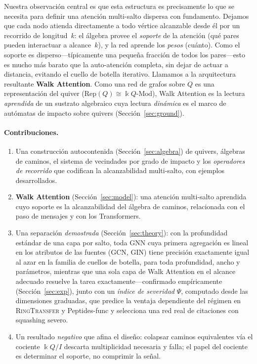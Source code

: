 \documentclass[runningheads]{llncs}
\newcommand{\kk}{\Bbbk}
\newcommand{\kQ}{\kk Q}
\begin{document}
Nuestra observación central es que esta estructura es precisamente lo que se
necesita para definir una atención multi-salto dispersa con fundamento. Dejamos
que cada nodo atienda directamente a todo vértice alcanzable desde él por un
recorrido de longitud~$k$: el álgebra provee el \emph{soporte} de la atención
(qué pares pueden interactuar a alcance~$k$), y la red aprende los \emph{pesos}
(cuánto). Como el soporte es disperso---típicamente una pequeña fracción de
todos los pares---esto es mucho más barato que la auto-atención completa, sin
dejar de actuar a distancia, evitando el cuello de botella iterativo. Llamamos
a la arquitectura resultante \textbf{Walk Attention}. Como una red de grafos sobre
$Q$ es una representación del quiver
($\mathrm{Rep}(Q)\cong\kQ\text{-}\mathrm{Mod}$), Walk Attention es la lectura
\emph{aprendida} de un sustrato algebraico cuya lectura \emph{dinámica} es el
marco de autómatas de impacto sobre quivers \cite{zainea2026aiq}
(Sección~\ref{sec:ground}).

\paragraph{Contribuciones.}
\begin{enumerate}
  \item Una construcción autocontenida (Sección~\ref{sec:algebra}) de quivers,
  álgebras de caminos, el sistema de vecindades por grado de impacto y los
  \emph{operadores de recorrido} que codifican la alcanzabilidad multi-salto,
  con ejemplos desarrollados.
  \item \textbf{Walk Attention} (Sección~\ref{sec:model}): una atención
  multi-salto aprendida cuyo soporte es la alcanzabilidad del álgebra de
  caminos, relacionada con el paso de mensajes y con los Transformers.
  \item Una separación \emph{demostrada} (Sección~\ref{sec:theory}): con la
  profundidad estándar de una capa por salto, toda GNN cuya primera agregación
  es lineal en los atributos de las fuentes (GCN, GIN) tiene precisión
  exactamente igual al azar en la familia de cuellos de botella, para toda
  profundidad, ancho y parámetros, mientras que una sola capa de Walk Attention
  en el alcance adecuado resuelve la tarea exactamente---confirmado
  empíricamente (Sección~\ref{sec:exp}), junto con un \emph{índice de
  severidad} $\Psi$, computado desde las dimensiones graduadas, que predice la
  ventaja dependiente del régimen en \textsc{RingTransfer} y Peptides-func y
  selecciona una red real de citaciones con squashing severo.
  \item Un resultado \emph{negativo} que afina el diseño: colapsar caminos
  equivalentes vía el cociente $\kQ/I$ descarta multiplicidad necesaria y
  falla; el papel del cociente es determinar el soporte, no comprimir la señal.
\end{enumerate}
\end{document}
